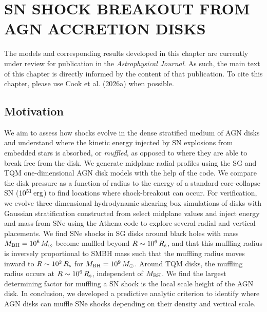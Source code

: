 \section{\texorpdfstring{\MakeUppercase{sn shock breakout from agn accretion disks}}{sn shock breakout from agn accretion disks}}
\label{sec:sn-hydrodynamics}


\par The models and corresponding results developed in this chapter are currently under review for publication in the \textit{Astrophysical Journal}.
As such, the main text of this chapter is directly informed by the content of that publication.
To cite this chapter, please use Cook et al. (2026a) when possible.

\subsection{Motivation}
\label{sec:motivation-snhydro}
We aim to assess how shocks evolve in the dense stratified medium of AGN disks and understand where the kinetic energy injected by SN explosions from embedded stars is absorbed, or \emph{muffled}, as opposed to where they are able to break free from the disk.
We generate midplane radial profiles using the SG and TQM one-dimensional AGN disk models with the help of the  code.
We compare the disk pressure as a function of radius to the energy of a standard core-collapse SN ($10^{51}\,{\rm erg}$) to find locations where shock-breakout can occur.
For verification, we evolve three-dimensional hydrodynamic shearing box simulations of disks with Gaussian stratification constructed from select midplane values and inject energy and mass from SNe using the Athena code to explore several radial and vertical placements.
We find SNe shocks in SG disks around black holes with mass $M_{\rm BH}=10^6\,M_{\odot}$ become muffled beyond $R\sim10^6\,R_{\rm s}$, and that this muffling radius is inversely proportional to SMBH mass such that the muffling radius moves inward to $R\sim10^2\,R_{\rm s}$ for $M_{\rm BH}=10^9\,M_{\odot}$.
Around TQM disks, the muffling radius occurs at $R\sim10^6\,R_{\rm s}$, independent of $M_{\rm BH}$.
We find the largest determining factor for muffling a SN shock is the local scale height of the AGN disk.
In conclusion, we developed a predictive analytic criterion to identify where AGN disks can muffle SNe shocks depending on their density and vertical scale.

